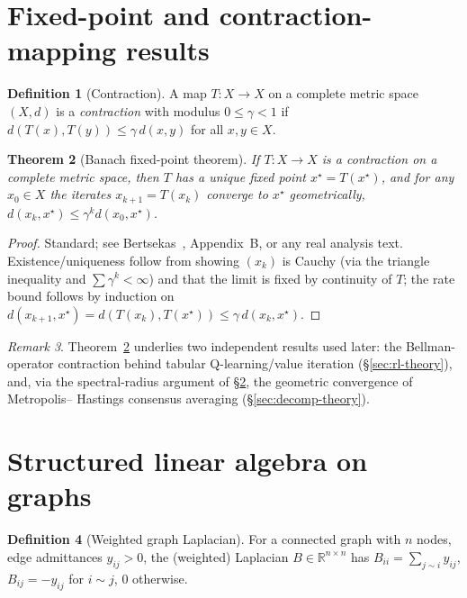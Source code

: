 \documentclass[11pt]{report}
\theoremstyle{plain}
\newtheorem{theorem}{Theorem}[chapter]
\theoremstyle{definition}
\newtheorem{definition}[theorem]{Definition}
\theoremstyle{remark}
\newtheorem{remark}[theorem]{Remark}
\begin{document}
\section{Fixed-point and contraction-mapping results}
\label{sec:fixedpoint-prelim}

\begin{definition}[Contraction]
A map $T:X\to X$ on a complete metric space $(X,d)$ is a
\emph{contraction} with modulus $0\le\gamma<1$ if
$d(T(x),T(y))\le\gamma\, d(x,y)$ for all $x,y\in X$.
\end{definition}

\begin{theorem}[Banach fixed-point theorem]
\label{thm:banach}
If $T:X\to X$ is a contraction on a complete metric space, then $T$ has
a unique fixed point $x^\star=T(x^\star)$, and for any $x_0\in X$ the
iterates $x_{k+1}=T(x_k)$ converge to $x^\star$ geometrically,
$d(x_k,x^\star)\le\gamma^k d(x_0,x^\star)$.
\end{theorem}
\begin{proof}
Standard; see Bertsekas~\cite{bertsekasDP}, Appendix~B, or any real
analysis text. Existence/uniqueness follow from showing $(x_k)$ is
Cauchy (via the triangle inequality and $\sum\gamma^k<\infty$) and that
the limit is fixed by continuity of $T$; the rate bound follows by
induction on $d(x_{k+1},x^\star)=d(T(x_k),T(x^\star))\le\gamma\,
d(x_k,x^\star)$.
\end{proof}

\begin{remark}
Theorem~\ref{thm:banach} underlies two independent results used later:
the Bellman-operator contraction behind tabular Q-learning/value
iteration (\S\ref{sec:rl-theory}), and, via the spectral-radius argument
of \S\ref{sec:graph-prelim}, the geometric convergence of Metropolis--
Hastings consensus averaging (\S\ref{sec:decomp-theory}).
\end{remark}

\section{Structured linear algebra on graphs}
\label{sec:graph-prelim}

\begin{definition}[Weighted graph Laplacian]
For a connected graph with $n$ nodes, edge admittances $y_{ij}>0$, the
(weighted) Laplacian $B\in\mathbb{R}^{n\times n}$ has
$B_{ii}=\sum_{j\sim i}y_{ij}$, $B_{ij}=-y_{ij}$ for $i\sim j$, $0$
otherwise.
\end{definition}
\end{document}
